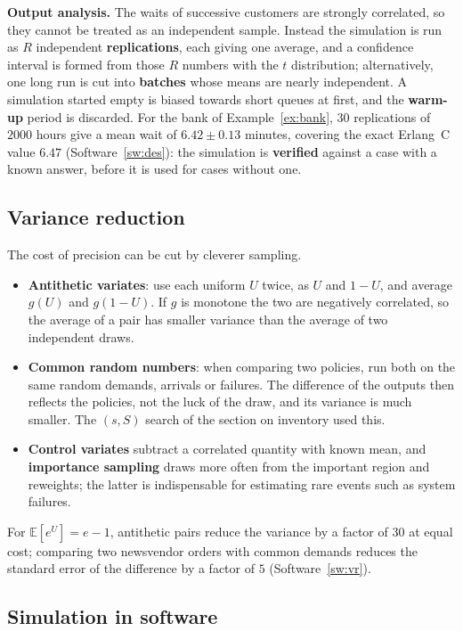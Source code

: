 \documentclass[11pt,a4paper]{article}
\numberwithin{equation}{section}
\theoremstyle{definition}
\begin{document}
\textbf{Output analysis.} The waits of successive customers are strongly correlated, so they cannot be treated as an independent sample. Instead the simulation is run as $R$ independent \textbf{replications}, each giving one average, and a confidence interval is formed from those $R$ numbers with the $t$ distribution; alternatively, one long run is cut into
\textbf{batches} whose means are nearly independent. A simulation started empty is biased towards short queues at first, and the \textbf{warm-up} period is discarded. For the bank of Example~\ref{ex:bank}, $30$ replications of $2000$ hours give a mean wait of $6.42 \pm 0.13$ minutes, covering the exact Erlang~C value $6.47$
(Software~\ref{sw:des}): the simulation is \textbf{verified} against a case with a known answer, before it is used for cases without one.

\subsection{Variance reduction}
\label{ssec:variance}

The cost of precision can be cut by cleverer sampling.
\begin{itemize}
\item \textbf{Antithetic variates}: use each uniform $U$ twice, as $U$ and $1 - U$, and average $g(U)$ and $g(1 - U)$. If $g$ is monotone the two are negatively correlated, so the average of a pair has smaller variance than the average of two independent draws.
\item \textbf{Common random numbers}: when comparing two policies, run both on the same random demands, arrivals or failures. The difference of the outputs then reflects the policies, not the luck of the draw, and its variance is much smaller. The $(s, S)$ search of the section on inventory used this.
\item \textbf{Control variates} subtract a correlated quantity with known mean, and \textbf{importance sampling} draws more often from the important region and reweights; the latter is indispensable for estimating rare events such as system failures.
\end{itemize}
For $\mathbb E[e^U] = e - 1$, antithetic pairs reduce the variance by a factor of $30$ at equal cost; comparing two newsvendor orders with common demands reduces the standard error of the difference by a factor of $5$ (Software~\ref{sw:vr}).

\subsection{Simulation in software}
\label{ssec:software16}
\end{document}
